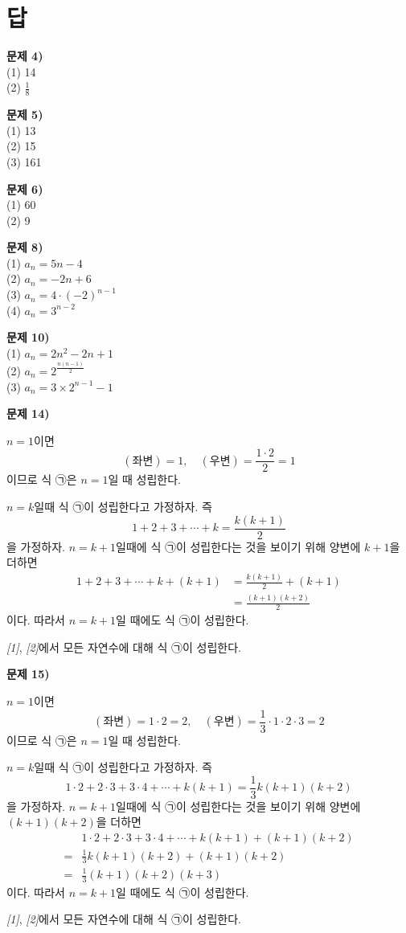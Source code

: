 \documentclass{oblivoir}
\newcounter{num}
\newcommand\an[1]{\par\bigskip\noindent\textbf{문제 #1)}\\}
\let\oldsection\section
\renewcommand\section{\clearpage\oldsection}
\begin{document}
\section*{답}
%
\an{4}
(1) 14\\
(2) \(\frac18\)

%
\an{5}
(1) 13\\
(2) 15\\
(3) 161

%
\an{6}
(1) 60\\
(2) 9

%
\an{8}
(1) \(a_n=5n-4\)\\
(2) \(a_n=-2n+6\)\\
(3) \(a_n=4\cdot(-2)^{n-1}\)\\
(4) \(a_n=3^{n-2}\)

%
\an{10}
(1) \(a_n=2n^2-2n+1\)\\
(2) \(a_n=2^{\frac{n(n-1)}2}\)\\
(3) \(a_n=3\times2^{n-1}-1\)

%
\an{14}
\begin{enumerate}[label=\emph{[\arabic*]}]
\item
\(n=1\)이면
\[(좌변)=1,\quad (우변)=\frac{1\cdot2}2=1\]
이므로 식 ㉠은 \(n=1\)일 때 성립한다.
\item
\(n=k\)일때 식 ㉠이 성립한다고 가정하자.
즉
\[
1+2+3+\cdots+k=\frac{k(k+1)}2
\]
을 가정하자.
\(n=k+1\)일때에 식 ㉠이 성립한다는 것을 보이기 위해 양변에 \(k+1\)을 더하면
\begin{align*}
1+2+3+\cdots+k+(k+1)
&=\frac{k(k+1)}2+(k+1)\\
&=\frac{(k+1)(k+2)}2
\end{align*}
이다.
따라서 \(n=k+1\)일 때에도 식 ㉠이 성립한다.
\end{enumerate}
\emph{[1]}, \emph{[2]}에서 모든 자연수에 대해 식 ㉠이 성립한다.

%
\an{15}
\begin{enumerate}[label=\emph{[\arabic*]}]
\item
\(n=1\)이면
\[(좌변)=1\cdot2=2,\quad (우변)=\frac13\cdot1\cdot2\cdot3=2\]
이므로 식 ㉠은 \(n=1\)일 때 성립한다.
\item
\(n=k\)일때 식 ㉠이 성립한다고 가정하자.
즉
\[1\cdot2+2\cdot3+3\cdot4+\cdots+k(k+1)=\frac13k(k+1)(k+2)\]
을 가정하자.
\(n=k+1\)일때에 식 ㉠이 성립한다는 것을 보이기 위해 양변에 \((k+1)(k+2)\)을 더하면
\begin{align*}
&1\cdot2+2\cdot3+3\cdot4+\cdots+k(k+1)+(k+1)(k+2)\\
=&\frac13k(k+1)(k+2)+(k+1)(k+2)\\
=&\frac13(k+1)(k+2)(k+3)
\end{align*}
이다.
따라서 \(n=k+1\)일 때에도 식 ㉠이 성립한다.
\end{enumerate}
\emph{[1]}, \emph{[2]}에서 모든 자연수에 대해 식 ㉠이 성립한다.
\end{document}
